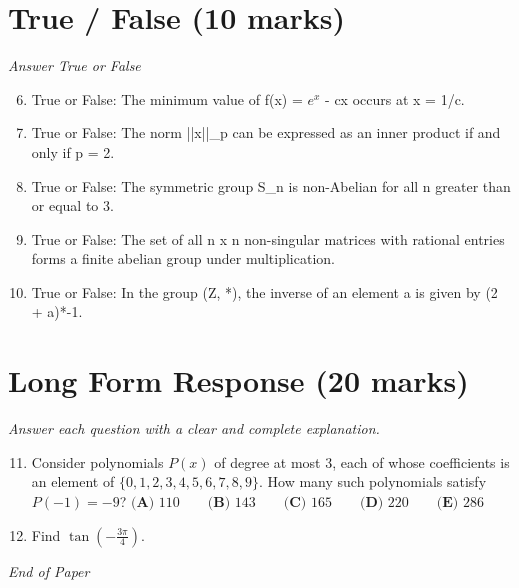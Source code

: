 \documentclass[12pt]{article}
\begin{document}
\section*{True / False (10 marks)}
\textit{Answer True or False}
\begin{enumerate}[label=\arabic*.]
\setcounter{enumi}{5}
\item True or False: The minimum value of f(x) = $e^x$ - cx occurs at x = 1/c.
\item True or False: The norm ||x||\_p can be expressed as an inner product if and only if p = 2.
\item True or False: The symmetric group S\_n is non-Abelian for all n greater than or equal to 3.
\item True or False: The set of all n x n non-singular matrices with rational entries forms a finite abelian group under multiplication.
\item True or False: In the group (Z, *), the inverse of an element a is given by (2 + a)*-1.
\end{enumerate}

\section*{Long Form Response (20 marks)}
\textit{Answer each question with a clear and complete explanation.}
\begin{enumerate}[label=\arabic*.]
\setcounter{enumi}{10}
\item Consider polynomials $P(x)$ of degree at most $3$, each of whose coefficients is an element of $\{0, 1, 2, 3, 4, 5, 6, 7, 8, 9\}$. How many such polynomials satisfy $P(-1) = -9$? $\textbf{(A) } 110 \qquad \textbf{(B) } 143 \qquad \textbf{(C) } 165 \qquad \textbf{(D) } 220 \qquad \textbf{(E) } 286$
\item Find $\tan \left( -\frac{3 \pi}{4} \right).$
\end{enumerate}

\vfill
\noindent\textit{End of Paper}
\end{document}
